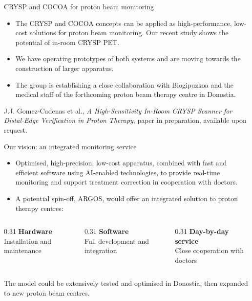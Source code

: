 \documentclass[aspectratio=169,11pt]{beamer}
\newcommand{\hi}[1]{\textcolor{crRed}{#1}}
\begin{document}
\begin{frame}{CRYSP and COCOA for proton beam monitoring}
\small
\begin{itemize}
\item The CRYSP and COCOA concepts can be applied as \hi{high-performance, low-cost solutions} for proton beam monitoring. Our recent study shows the potential of in-room CRYSP PET.
\item We have \hi{operating prototypes of both systems} and are moving towards the construction of larger apparatus.
\item The group is establishing a close collaboration with \hi{Biogipuzkoa} and the medical staff of the forthcoming proton beam therapy centre in \hi{Donostia}.
\end{itemize}
\par\vspace{3mm}
{\scriptsize\color{crGrey} J.J. Gomez-Cadenas et al., \emph{A High-Sensitivity In-Room CRYSP Scanner for Distal-Edge Verification in Proton Therapy}, paper in preparation, available upon request.}
\end{frame}

\begin{frame}{Our vision: an integrated monitoring service}
\small
\begin{itemize}
\item Optimised, \hi{high-precision, low-cost apparatus}, combined with fast and efficient software using \hi{AI-enabled technologies}, to provide real-time monitoring and support treatment correction in cooperation with doctors.
\item A potential spin-off, \hi{ARGOS}, would offer an integrated solution to proton therapy centres:
\end{itemize}
\par\vspace{2mm}
\begin{columns}[T,onlytextwidth]
\begin{column}{0.31\textwidth}
\centering\textbf{Hardware}\\[2mm]
Installation and maintenance
\end{column}
\begin{column}{0.31\textwidth}
\centering\textbf{Software}\\[2mm]
Full development and integration
\end{column}
\begin{column}{0.31\textwidth}
\centering\textbf{Day-by-day service}\\[2mm]
Close cooperation with doctors
\end{column}
\end{columns}
\par\vspace{5mm}
The model could be extensively tested and optimised in \hi{Donostia}, then expanded to new proton beam centres.
\end{frame}
\end{document}
